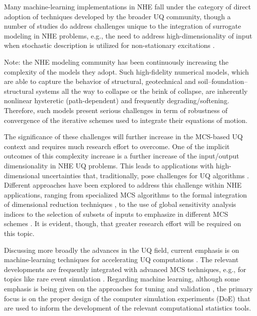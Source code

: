 Many machine-learning implementations in NHE fall under the category of direct adoption of techniques developed by the broader UQ community, though a number of studies do address challenges unique to the integration of surrogate modeling in NHE problems, e.g., the need to address high-dimensionality of input when stochastic description is utilized for non-stationary excitations \citep{gidaris2015kriging}.  

Note: the NHE modeling community has been continuously increasing the complexity of the models they adopt. Such high-fidelity numerical models, which are able to capture the behavior of structural, geotechnical and soil--foundation--structural systems all the way to collapse or the brink of collapse, are inherently nonlinear hysteretic (path-dependent) and frequently degrading/softening. Therefore, such models present serious challenges in term of robustness of convergence of the iterative schemes used to integrate their equations of motion.

The significance of these challenges will further increase in the MCS-based UQ context and requires much research effort to overcome. One of the implicit outcomes of this complexity increase is a further increase of the input/output dimensionality in NHE UQ problems. This leads to applications with high-dimensional uncertainties that, traditionally, pose challenges for UQ algorithms \citep{au2003importance, schueller2004critical}. Different approaches have been explored to address this challenge within NHE applications, ranging from specialized MCS algorithms \citep{au2001estimation, wang2016crossentropybased} to the formal integration of dimensional reduction techniques \citep{jia2013kriging}, to the use of global sensitivity analysis indices to the selection of subsets of inputs to emphasize in different MCS schemes \citep{jia2014adaptive}. It is evident, though, that greater research effort will be required on this topic.     

Discussing more broadly the advances in the UQ field, current emphasis is on machine-learning techniques for accelerating UQ computations \citep{murphy2012machine, ghanem2017handbook, tripathy2018deep}. The relevant developments are frequently integrated with advanced MCS techniques, e.g., for topics like rare event simulation \citep{li2011efficient, balesdent2013krigingbased, bourinet2016rareevent}. Regarding machine learning, although some emphasis is being given on the approaches for tuning and validation \citep{mehmani2018concurrent}, the primary focus is on the proper design of the computer simulation experiments (DoE) \citep{kleijnen2008design, picheny2010adaptive, kyprioti2020adaptive} that are used to inform the development of the relevant computational statistics tools.

